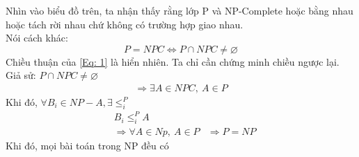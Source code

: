 Nhìn vào biểu đồ trên, ta nhận thấy rằng lớp P và NP-Complete hoặc bằng nhau hoặc tách rời nhau chứ không có trường hợp giao nhau.\\
	Nói cách khác:
	\begin{equation}\label{Eq: 1}
		P = NPC \Leftrightarrow P \cap NPC \neq \varnothing
	\end{equation}
	Chiều thuận của \ref{Eq: 1} là hiển nhiên. Ta chỉ cần chứng minh chiều ngược lại.\\
	Giả sử: $P \cap NPC \neq \varnothing$
	\begin{align*}
		\Rightarrow \exists A \in NPC,~ A \in P
	\end{align*}
	Khi đó, $\forall B_{i} \in NP - {A}, \exists \leq^{P}_{i}$
	\begin{align*}\label{Eq: 2}
		&B_{i} \leq^{P}_{i} A\\
		&\Rightarrow \forall A \in Np,~ A \in P
		&\Rightarrow P = NP
	\end{align*}
	Khi đó, mọi bài toán trong NP đều có 